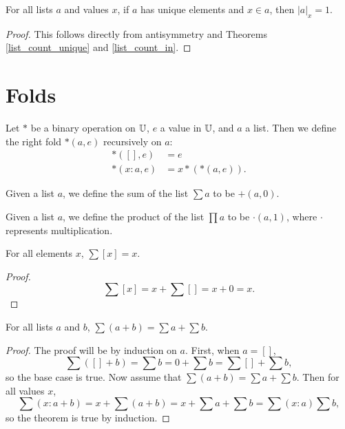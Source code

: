 \documentclass[../math.tex]{subfiles}
\begin{document}
\begin{theorem} \label{list_count_in_unique}
    For all lists $a$ and values $x$, if $a$ has unique elements and $x \in a$,
    then $|a|_x = 1$.
\end{theorem}
\begin{proof}
    This follows directly from antisymmetry and Theorems \ref{list_count_unique}
    and \ref{list_count_in}.
\end{proof}

\section{Folds}

\begin{definition}
    Let $*$ be a binary operation on $\mathbb{U}$, $e$ a value in $\mathbb{U}$, and $a$ a list.
    Then we define the right fold $*(a, e)$ recursively on $a$:
    \begin{align*}
           *([], e) &= e \\
        *(x : a, e) &= x * (*(a, e)).
    \end{align*}
\end{definition}

\begin{definition}
    Given a list $a$, we define the sum of the list $\sum a$ to be $+(a, 0)$.
\end{definition}

\begin{definition}
    Given a list $a$, we define the product of the list $\prod a$ to be
    $\cdot(a, 1)$, where $\cdot$ represents multiplication.
\end{definition}

\begin{theorem}
    For all elements $x$, $\sum [x] = x$.
\end{theorem}
\begin{proof}
    \[
        \sum [x] = x + \sum [] = x + 0 = x.
    \]
\end{proof}

\begin{theorem} \label{list_sum_conc}
    For all lists $a$ and $b$, $\sum (a + b) = \sum a + \sum b$.
\end{theorem}
\begin{proof}
    The proof will be by induction on $a$.  First, when $a = []$,
    \[
        \sum ([] + b) = \sum b = 0 + \sum b = \sum [] + \sum b,
    \]
    so the base case is true.  Now assume that $\sum (a + b) = \sum a + \sum b.$
    Then for all values $x$,
    \[
        \sum(x : a + b) = x + \sum(a + b) = x + \sum a + \sum b = \sum (x : a)
        \sum b,
    \]
    so the theorem is true by induction.
\end{proof}
\end{document}
